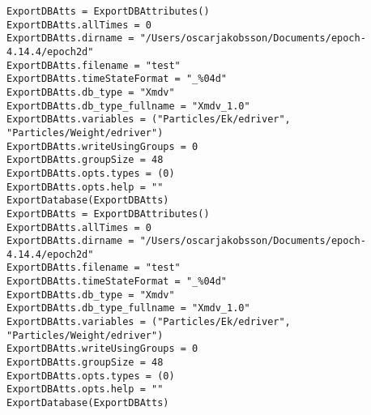 \clearpage
\begin{verbatim}
ExportDBAtts = ExportDBAttributes()
ExportDBAtts.allTimes = 0
ExportDBAtts.dirname = "/Users/oscarjakobsson/Documents/epoch-4.14.4/epoch2d"
ExportDBAtts.filename = "test"
ExportDBAtts.timeStateFormat = "_%04d"
ExportDBAtts.db_type = "Xmdv"
ExportDBAtts.db_type_fullname = "Xmdv_1.0"
ExportDBAtts.variables = ("Particles/Ek/edriver", "Particles/Weight/edriver")
ExportDBAtts.writeUsingGroups = 0
ExportDBAtts.groupSize = 48
ExportDBAtts.opts.types = (0)
ExportDBAtts.opts.help = ""
ExportDatabase(ExportDBAtts)
ExportDBAtts = ExportDBAttributes()
ExportDBAtts.allTimes = 0
ExportDBAtts.dirname = "/Users/oscarjakobsson/Documents/epoch-4.14.4/epoch2d"
ExportDBAtts.filename = "test"
ExportDBAtts.timeStateFormat = "_%04d"
ExportDBAtts.db_type = "Xmdv"
ExportDBAtts.db_type_fullname = "Xmdv_1.0"
ExportDBAtts.variables = ("Particles/Ek/edriver", "Particles/Weight/edriver")
ExportDBAtts.writeUsingGroups = 0
ExportDBAtts.groupSize = 48
ExportDBAtts.opts.types = (0)
ExportDBAtts.opts.help = ""
ExportDatabase(ExportDBAtts)

\end{verbatim}


